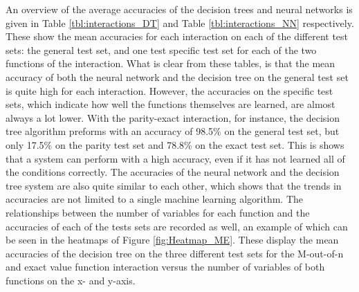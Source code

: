 \documentclass[letterpaper]{article} %
\begin{document}
\begin{table}[h!]
\centering
\caption{The mean accuracies of the neural network on each test set after training on each interaction. }
\label{tbl:interactions_NN}
\end{table}

An overview of the average accuracies of the decision trees and neural networks is given in Table \ref{tbl:interactions_DT} and Table \ref{tbl:interactions_NN} respectively. These show the mean accuracies for each interaction on each of the different test sets: the general test set, and one test specific test set for each of the two functions of the interaction. What is clear from these tables, is that the mean accuracy of both the neural network and the decision tree on the general test set is quite high for each interaction. However, the accuracies on the specific test sets, which indicate how well the functions themselves are learned, are almost always a lot lower. With the parity-exact interaction, for instance, the decision tree algorithm preforms with an accuracy of 98.5\% on the general test set, but only 17.5\% on the parity test set and 78.8\% on the exact test set. This is shows that a system can perform with a high accuracy, even if it has not learned all of the conditions correctly. The accuracies of the neural network and the decision tree system are also quite similar to each other, which shows that the trends in accuracies are not limited to a single machine learning algorithm. The relationships between the number of variables for each function and the accuracies of each of the tests sets are recorded as well, an example of which can be seen in the heatmaps of Figure \ref{fig:Heatmap_ME}. These display the mean accuracies of the decision tree on the three different test sets for the M-out-of-n and exact value function interaction versus the number of variables of both functions on the x- and y-axis.
\end{document}
